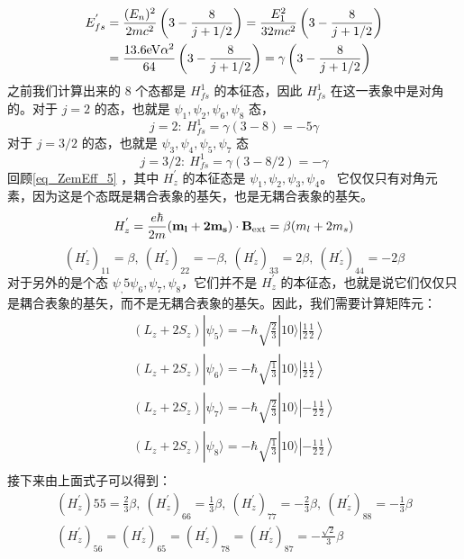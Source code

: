\begin{align}
E_{fs}^{'}&=\frac{(E_n)^2}{2mc^2}\left(3-\frac{8}{j+1/2}\right)=\frac{E_1^2}{32mc^2}\left(3-\frac{8}{j+1/2}\right)\\
&=\frac{13.6\rm{eV}\alpha^2}{64}\left(3-\frac{8}{j+1/2}\right)=\gamma\left(3-\frac{8}{j+1/2}\right)
\end{align}
之前我们计算出来的 $8$ 个态都是 $H_{fs}^1$ 的本征态，因此 $H_{fs}^1$ 在这一表象中是对角的。对于 $j=2$ 的态，也就是 $\psi_1,\psi_2,\psi_6,\psi_8$ 态，
\begin{equation}
j=2: \ H_{fs}^1=\gamma(3-8)=-5\gamma
\end{equation}
对于 $j=3/2$ 的态，也就是 $\psi_3,\psi_4,\psi_5,\psi_7$ 态
\begin{equation}
j=3/2: \ H_{fs}^1=\gamma(3-8/2)=-\gamma
\end{equation}
回顾\autoref{eq_ZemEff_5} ，其中 $H_z^{'}$ 的本征态是 $\psi_1,\psi_2,\psi_3,\psi_4$。 它仅仅只有对角元素，因为这是个态既是耦合表象的基矢，也是无耦合表象的基矢。
\begin{equation}
H_z^{'} = \frac{e\hbar}{2m}(\mathbf{m_l+2m_s})\cdot \mathbf{B}_{\rm{ext}}=\beta(m_l+2m_s)
\end{equation}
\begin{equation}
(H_z^{'})_{11}=\beta,\ (H_z^{'})_{22}=-\beta,\ (H_z^{'})_{33}=2\beta,\ (H_z^{'})_{44}=-2\beta
\end{equation}
对于另外的是个态 $\psi_,5\psi_6,\psi_7,\psi_8$，它们并不是 $H_{z}^{'}$ 的本征态，也就是说它们仅仅只是耦合表象的基矢，而不是无耦合表象的基矢。因此，我们需要计算矩阵元：
\begin{align}
(L_z+2S_z)|\psi_5\rangle= -\hbar\sqrt{\frac{2}{3}}|10\rangle\left|\frac{1}{2}\frac{1}{2}\right\rangle\\
(L_z+2S_z)|\psi_6\rangle=-\hbar\sqrt{\frac{1}{3}}|10\rangle\left|\frac{1}{2}\frac{1}{2}\right\rangle \\
(L_z+2S_z)|\psi_7\rangle=-\hbar\sqrt{\frac{2}{3}}|10\rangle\left|-\frac{1}{2}\frac{1}{2}\right\rangle \\
(L_z+2S_z)|\psi_8\rangle= -\hbar\sqrt{\frac{1}{3}}|10\rangle\left|-\frac{1}{2}\frac{1}{2}\right\rangle\\
\end{align}
接下来由上面式子可以得到：
\begin{align}
(H_z^{'}){55}=\frac{2}{3}\beta,\ (H_z^{'})_{66}=\frac{1}{3}\beta,\ (H_z^{'})_{77}=-\frac{2}{3}\beta,\ (H_z^{'})_{88}=-\frac{1}{3}\beta\\
(H_z^{'})_{56}=(H_z^{'})_{65}=(H_z^{'})_{78}=(H_z^{'})_{87}=-\frac{\sqrt{2}}{3}\beta
\end{align}
